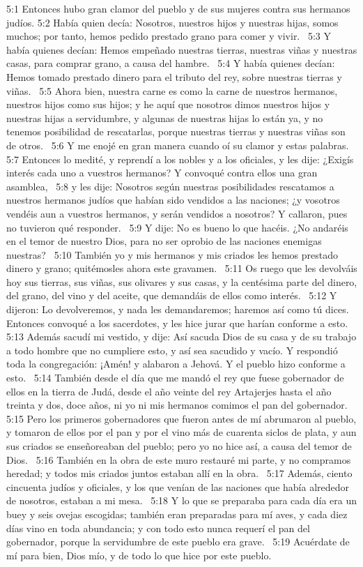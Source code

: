 5:1 Entonces hubo gran clamor del pueblo y de sus mujeres contra sus hermanos judíos. 
5:2 Había quien decía: Nosotros, nuestros hijos y nuestras hijas, somos muchos; por tanto, hemos pedido prestado grano para comer y vivir.  
5:3 Y había quienes decían: Hemos empeñado nuestras tierras, nuestras viñas y nuestras casas, para comprar grano, a causa del hambre.  
5:4 Y había quienes decían: Hemos tomado prestado dinero para el tributo del rey, sobre nuestras tierras y viñas.  
5:5 Ahora bien, nuestra carne es como la carne de nuestros hermanos, nuestros hijos como sus hijos; y he aquí que nosotros dimos nuestros hijos y nuestras hijas a servidumbre, y algunas de nuestras hijas lo están ya, y no tenemos posibilidad de rescatarlas, porque nuestras tierras y nuestras viñas son de otros.  
5:6 Y me enojé en gran manera cuando oí su clamor y estas palabras.  
5:7 Entonces lo medité, y reprendí a los nobles y a los oficiales, y les dije: ¿Exigís interés cada uno a vuestros hermanos? Y convoqué contra ellos una gran asamblea,  
5:8 y les dije: Nosotros según nuestras posibilidades rescatamos a nuestros hermanos judíos que habían sido vendidos a las naciones; ¿y vosotros vendéis aun a vuestros hermanos, y serán vendidos a nosotros? Y callaron, pues no tuvieron qué responder.  
5:9 Y dije: No es bueno lo que hacéis. ¿No andaréis en el temor de nuestro Dios, para no ser oprobio de las naciones enemigas nuestras?  
5:10 También yo y mis hermanos y mis criados les hemos prestado dinero y grano; quitémosles ahora este gravamen.  
5:11 Os ruego que les devolváis hoy sus tierras, sus viñas, sus olivares y sus casas, y la centésima parte del dinero, del grano, del vino y del aceite, que demandáis de ellos como interés.  
5:12 Y dijeron: Lo devolveremos, y nada les demandaremos; haremos así como tú dices. Entonces convoqué a los sacerdotes, y les hice jurar que harían conforme a esto.  
5:13 Además sacudí mi vestido, y dije: Así sacuda Dios de su casa y de su trabajo a todo hombre que no cumpliere esto, y así sea sacudido y vacío. Y respondió toda la congregación: ¡Amén! y alabaron a Jehová. Y el pueblo hizo conforme a esto.  
5:14 También desde el día que me mandó el rey que fuese gobernador de ellos en la tierra de Judá, desde el año veinte del rey Artajerjes hasta el año treinta y dos, doce años, ni yo ni mis hermanos comimos el pan del gobernador.  
5:15 Pero los primeros gobernadores que fueron antes de mí abrumaron al pueblo, y tomaron de ellos por el pan y por el vino más de cuarenta siclos de plata, y aun sus criados se enseñoreaban del pueblo; pero yo no hice así, a causa del temor de Dios.  
5:16 También en la obra de este muro restauré mi parte, y no compramos heredad; y todos mis criados juntos estaban allí en la obra.  
5:17 Además, ciento cincuenta judíos y oficiales, y los que venían de las naciones que había alrededor de nosotros, estaban a mi mesa.  
5:18 Y lo que se preparaba para cada día era un buey y seis ovejas escogidas; también eran preparadas para mí aves, y cada diez días vino en toda abundancia; y con todo esto nunca requerí el pan del gobernador, porque la servidumbre de este pueblo era grave.  
5:19 Acuérdate de mí para bien, Dios mío, y de todo lo que hice por este pueblo.  
